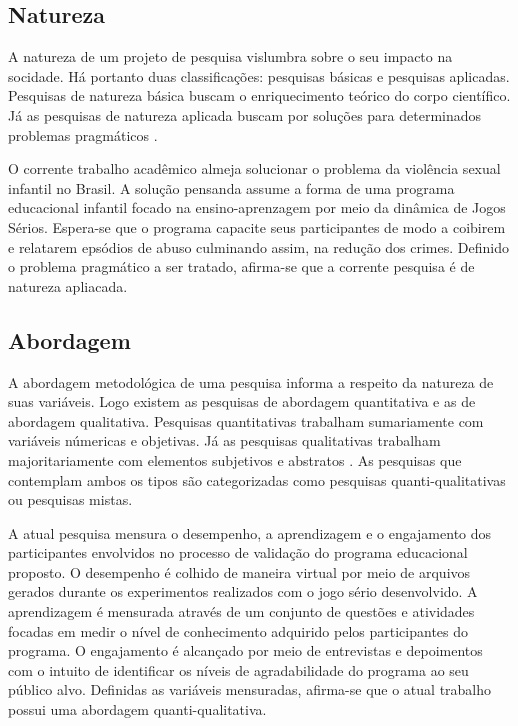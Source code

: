

\subsection{Natureza}\label{sub:natureza}

A natureza de um projeto de pesquisa vislumbra sobre o seu impacto na socidade. Há portanto duas classificações: pesquisas básicas e pesquisas aplicadas. Pesquisas de natureza básica buscam o enriquecimento teórico do corpo científico. Já as pesquisas de natureza aplicada buscam por soluções para determinados problemas pragmáticos \cite{zanella2006metodologia}.

O corrente trabalho acadêmico almeja solucionar o problema da violência sexual infantil no Brasil. A solução pensanda assume a forma de uma programa educacional infantil focado na ensino-aprenzagem por meio da dinâmica de Jogos Sérios. Espera-se que o programa capacite seus participantes de modo a coibirem e relatarem epsódios de abuso culminando assim, na redução dos crimes. Definido o problema pragmático a ser tratado, afirma-se que a corrente pesquisa é de natureza apliacada.



\subsection{Abordagem}\label{sub:abordagem}

A abordagem metodológica de uma pesquisa informa a respeito da natureza de suas variáveis. Logo existem as pesquisas de abordagem quantitativa e as de abordagem qualitativa. Pesquisas quantitativas trabalham sumariamente com variáveis númericas e objetivas. Já as pesquisas qualitativas trabalham majoritariamente com elementos subjetivos e abstratos \cite{carlos2002elaborar}. As pesquisas que contemplam ambos os tipos são categorizadas como pesquisas quanti-qualitativas ou pesquisas mistas. 

A atual pesquisa mensura o desempenho, a aprendizagem e o engajamento dos participantes envolvidos no processo de validação do programa educacional proposto. O desempenho é colhido de maneira virtual por meio de arquivos gerados durante os experimentos realizados com o jogo sério desenvolvido. A aprendizagem é mensurada através de um conjunto de questões e atividades focadas em medir o nível de conhecimento adquirido pelos participantes do programa. O engajamento é alcançado por meio de entrevistas e depoimentos com o intuito de identificar os níveis de agradabilidade do programa ao seu público alvo. Definidas as variáveis mensuradas, afirma-se que o atual trabalho possui uma abordagem quanti-qualitativa.

